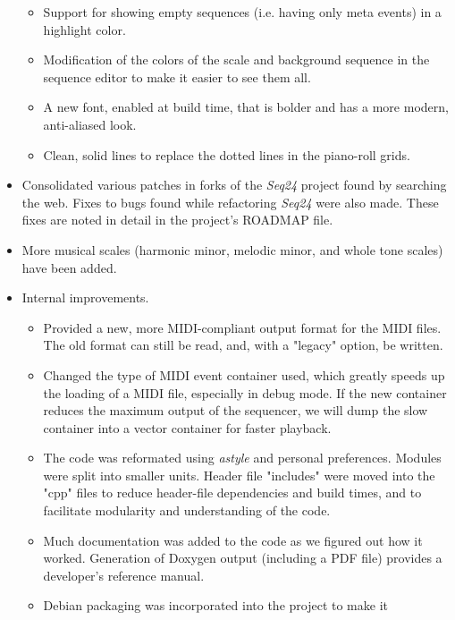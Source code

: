 \documentclass[
 11pt,
 twoside,
 a4paper,
 headinclude,
 footinclude,
 final                                 %
]{article}
\begin{document}
\begin{itemize}
      \begin{itemize}
         \item Support for showing empty sequences (i.e. having only meta
            events) in a highlight color.
         \item Modification of the colors of the scale and background sequence
            in the sequence editor to make it easier to see them all.
         \item A new font, enabled at build time, that is bolder and has a
            more modern, anti-aliased look.
         \item Clean, solid lines to replace the dotted lines in the piano-roll
            grids.
      \end{itemize}
      \item Consolidated various patches in forks of the \textsl{Seq24}
         project found by searching the web.  Fixes to bugs found while
         refactoring \textsl{Seq24} were also made.  These fixes are noted in
         detail in the project's ROADMAP file.
      \item More musical scales (harmonic minor, melodic minor, and
         whole tone scales) have been added.
      \item Internal improvements.
      \begin{itemize}
         \item Provided a new, more MIDI-compliant output format for the MIDI
            files.  The old format can still be read, and, with a "legacy" option,
            be written.
         \item Changed the type of MIDI event container used, which greatly speeds
            up the loading of a MIDI file, especially in debug mode.
            If the new container reduces the maximum output of the sequencer,
            we will dump the slow container into a vector container for faster
            playback.
         \item The code was reformated using \textsl{astyle} and
            personal preferences.  Modules were split into smaller units.
            Header file "includes" were moved into the "cpp" files to reduce
            header-file dependencies and build times, and to facilitate
            modularity and understanding of the code.
         \item Much documentation was added to the code as we figured
            out how it worked.  Generation of Doxygen output (including a PDF
            file) provides a developer's reference manual.
         \item Debian packaging was incorporated into the project to make it

\end{itemize}
\end{itemize}
\end{document}
